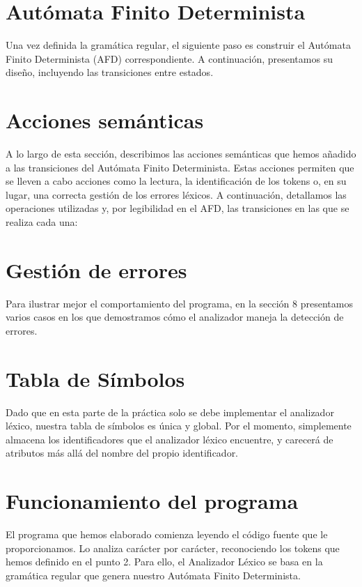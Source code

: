 \documentclass{article}
\begin{document}


\section{Autómata Finito Determinista}
Una vez definida la gramática regular, el siguiente paso es construir el Autómata Finito Determinista (AFD) correspondiente. A continuación, presentamos su diseño, incluyendo las transiciones entre estados.



\section{Acciones semánticas}
A lo largo de esta sección, describimos las acciones semánticas que hemos añadido a las transiciones del Autómata Finito Determinista. Estas acciones permiten que se lleven a cabo acciones como la lectura, la identificación de los tokens o, en su lugar, una correcta gestión de los errores léxicos. A continuación, detallamos las operaciones utilizadas y, por legibilidad en el AFD, las transiciones en las que se realiza cada una:\\


\section{Gestión de errores}


Para ilustrar mejor el comportamiento del programa, en la sección 8 presentamos varios casos en los que demostramos cómo el analizador maneja la detección de errores.

\section{Tabla de Símbolos}
Dado que en esta parte de la práctica solo se debe implementar el analizador léxico, nuestra tabla de símbolos es única y global. Por el momento, simplemente almacena los identificadores que el analizador léxico encuentre, y carecerá de atributos más allá del nombre del propio identificador.

\section{Funcionamiento del programa}
El programa que hemos elaborado comienza leyendo el código fuente que le proporcionamos. Lo analiza carácter por carácter, reconociendo los tokens que hemos definido en el punto 2. Para ello, el Analizador Léxico se basa en la gramática regular que genera nuestro Autómata Finito Determinista.
\end{document}
